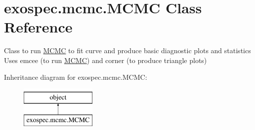 \hypertarget{classexospec_1_1mcmc_1_1_m_c_m_c}{}\section{exospec.\+mcmc.\+M\+C\+MC Class Reference}
\label{classexospec_1_1mcmc_1_1_m_c_m_c}


Class to run \hyperlink{classexospec_1_1mcmc_1_1_m_c_m_c}{M\+C\+MC} to fit curve and produce basic diagnostic plots and statistics Uses emcee (to run \hyperlink{classexospec_1_1mcmc_1_1_m_c_m_c}{M\+C\+MC}) and corner (to produce triangle plots)  


Inheritance diagram for exospec.\+mcmc.\+M\+C\+MC\+:\begin{figure}[H]
\begin{center}
\leavevmode
\includegraphics[height=2.000000cm]{classexospec_1_1mcmc_1_1_m_c_m_c}
\end{center}
\end{figure}
